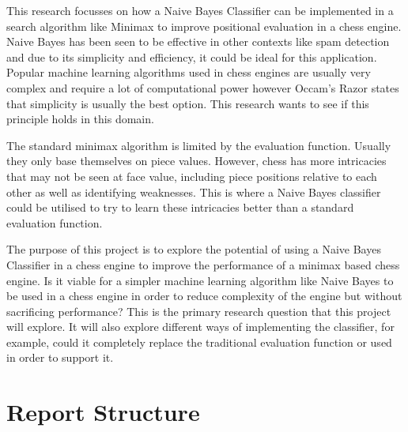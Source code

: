 \documentclass[20pt]{informatics-report}
\begin{document}
This research focusses on how a Naive Bayes Classifier can be implemented in a search algorithm like Minimax to improve positional evaluation in a chess engine. Naive Bayes has been seen to be effective in other contexts like spam detection and due to its simplicity and efficiency, it could be ideal for this application. Popular machine learning algorithms used in chess engines are usually very complex and require a lot of computational power however Occam's Razor states that simplicity is usually the best option. This research wants to see if this principle holds in this domain. 

The standard minimax algorithm is limited by the evaluation function. Usually they only base themselves on piece values. However, chess has more intricacies that may not be seen at face value, including piece positions relative to each other as well as identifying weaknesses. This is where a Naive Bayes classifier could be utilised to try to learn these intricacies better than a standard evaluation function.

The purpose of this project is to explore the potential of using a Naive Bayes Classifier in a chess engine to improve the performance of a minimax based chess engine. Is it viable for a simpler machine learning algorithm like Naive Bayes to be used in a chess engine in order to reduce complexity of the engine but without sacrificing performance? This is the primary research question that this project will explore. It will also explore different ways of implementing the classifier, for example, could it completely replace the traditional evaluation function or used in order to support it.




\section{Report Structure}



% 

% 
% 
% 








\appendix



\end{document}
